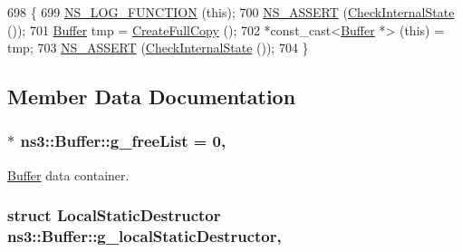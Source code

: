 \begin{DoxyCode}
698 \{
699   \hyperlink{log-macros-disabled_8h_a90b90d5bad1f39cb1b64923ea94c0761}{NS\_LOG\_FUNCTION} (\textcolor{keyword}{this});
700   \hyperlink{assert_8h_a6dccdb0de9b252f60088ce281c49d052}{NS\_ASSERT} (\hyperlink{classns3_1_1Buffer_a6202ce7f1ecc1fc7a14cc13017375d14}{CheckInternalState} ());
701   \hyperlink{classns3_1_1Buffer_a287c877504ddcdbc244de0ca66227fda}{Buffer} tmp = \hyperlink{classns3_1_1Buffer_a8dd09a348caee9051b2aa3a154ab09e5}{CreateFullCopy} ();
702   *\textcolor{keyword}{const\_cast<}\hyperlink{classns3_1_1Buffer_a287c877504ddcdbc244de0ca66227fda}{Buffer} *\textcolor{keyword}{>} (\textcolor{keyword}{this}) = tmp;
703   \hyperlink{assert_8h_a6dccdb0de9b252f60088ce281c49d052}{NS\_ASSERT} (\hyperlink{classns3_1_1Buffer_a6202ce7f1ecc1fc7a14cc13017375d14}{CheckInternalState} ());
704 \}
\end{DoxyCode}


\subsection{Member Data Documentation}
\subsubsection[{\texorpdfstring{g\+\_\+free\+List}{g_freeList}}]{ $\ast$ ns3\+::\+Buffer\+::g\+\_\+free\+List = 0\hspace{0.3cm}{\ttfamily [static]}, {\ttfamily [private]}}\hypertarget{classns3_1_1Buffer_a2d52975c7aad897af5a953a854906582}{}\label{classns3_1_1Buffer_a2d52975c7aad897af5a953a854906582}


\hyperlink{classns3_1_1Buffer}{Buffer} data container. 

\subsubsection[{\texorpdfstring{g\+\_\+local\+Static\+Destructor}{g_localStaticDestructor}}]{\setlength{\rightskip}{0pt plus 5cm}struct {\bf Local\+Static\+Destructor} ns3\+::\+Buffer\+::g\+\_\+local\+Static\+Destructor\hspace{0.3cm}{\ttfamily [static]}, {\ttfamily [private]}}\hypertarget{classns3_1_1Buffer_a42a32bf7da525c42762fa737585e8c81}{}\label{classns3_1_1Buffer_a42a32bf7da525c42762fa737585e8c81}


